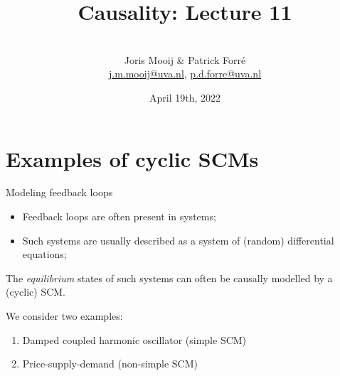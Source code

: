 \title[Causality]{Causality: Lecture 11}
\author[Joris Mooij]{\\[5mm]\large Joris Mooij \& Patrick Forr\'e\\
\url{j.m.mooij@uva.nl}, \url{p.d.forre@uva.nl}}
\date[2022-04-19]{\normalsize April 19th, 2022}
\maketitle

\part{Examples of cyclic SCMs}
\frame{\partpage}

\begin{frame}{Modeling feedback loops}
  \begin{itemize}
    \item Feedback loops are often present in systems;
    \item Such systems are usually described as a system of (random) differential equations;
  \end{itemize}

  \bigskip
The \emph{equilibrium} states of such systems can often be causally modelled by a (cyclic) SCM.

\bigskip
We consider two examples:
  \begin{enumerate}
    \item Damped coupled harmonic oscillator (simple SCM)
    \item Price-supply-demand (non-simple SCM)
  \end{enumerate}
\end{frame}


